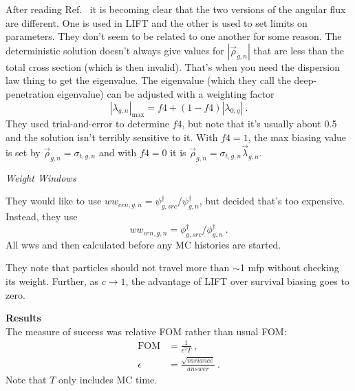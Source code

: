 \documentclass[12pt,twoside]{article}
\begin{document}
After reading Ref.~\cite{Turner1997b} it is becoming clear that the two versions of the angular flux are different. One is used in LIFT and the other is used to set limits on parameters. They don't seem to be related to one another for some reason. The deterministic solution doesn't always give values for $|\vec{\rho}_{g,n}|$ that are less than the total cross section (which is then invalid). That's when you need the dispersion law thing to get the eigenvalue. The eigenvalue (which they call the deep-penetration eigenvalue) can be adjusted with a weighting factor
\begin{equation}
  |\lambda_{g,n}|_{\max} = f4 + (1-f4)|\lambda_{0,g}|\:.
\end{equation}
They used trial-and-error to determine $f4$, but note that it's usually about 0.5 and the solution isn't terribly sensitive to it. With $f4=1$, the max biasing value is set by $\vec{\rho}_{g,n} = \sigma_{t,g,n}$ and with $f4=0$ it is $\vec{\rho}_{g,n} = \sigma_{t,g,n} \vec{\lambda}_{g,n}$. 


\vspace*{1em}
\noindent \textit{Weight Windows}

They would like to use $ww_{cen,g,n} = \psi^{\dagger}_{g,src} / \psi^{\dagger}_{g,n}$, but decided that's too expensive. Instead, they use
\begin{equation}
  ww_{cen,g,n} = \phi^{\dagger}_{g,src} / \phi^{\dagger}_{g,n} \:.
\end{equation}
All wws and then calculated before any MC histories are started. 

They note that particles should not travel more than $\sim$1 mfp without checking its weight. Further, as $c \rightarrow 1$, the advantage of LIFT over survival biasing goes to zero. 


\vspace*{1em}
\noindent \textbf{Results}\\
The measure of success was relative FOM rather than usual FOM:
\begin{align}
  \text{FOM} &= \frac{1}{\epsilon^2 T}\:, \\
  \epsilon &= \frac{\sqrt{variance}}{answer} \:.
\end{align}
Note that $T$ only includes MC time. 
\\
\end{document}
